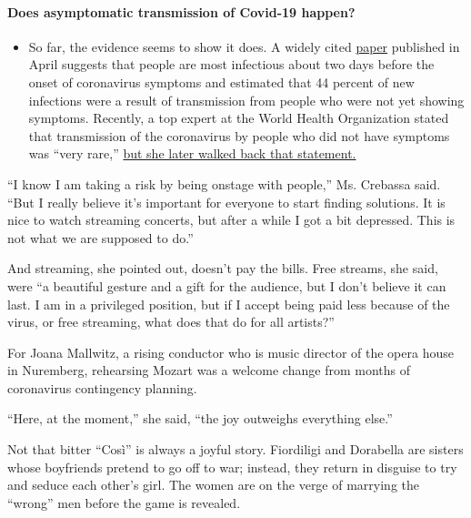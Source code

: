 \begin{itemize}
{  \paragraph{Does asymptomatic transmission of Covid-19
  happen?}\label{does-asymptomatic-transmission-of-covid-19-happen}}

  \begin{itemize}
  \tightlist
  \item
    So far, the evidence seems to show it does. A widely cited
    \href{https://www.nature.com/articles/s41591-020-0869-5}{paper}
    published in April suggests that people are most infectious about
    two days before the onset of coronavirus symptoms and estimated that
    44 percent of new infections were a result of transmission from
    people who were not yet showing symptoms. Recently, a top expert at
    the World Health Organization stated that transmission of the
    coronavirus by people who did not have symptoms was ``very rare,''
    \href{https://www.nytimes3xbfgragh.onion/2020/06/09/world/coronavirus-updates.html?action=click\&pgtype=Article\&state=default\&region=MAIN_CONTENT_3\&context=storylines_faq\#link-1f302e21}{but
    she later walked back that statement.}
  \end{itemize}
\end{itemize}

``I know I am taking a risk by being onstage with people,'' Ms. Crebassa
said. ``But I really believe it's important for everyone to start
finding solutions. It is nice to watch streaming concerts, but after a
while I got a bit depressed. This is not what we are supposed to do.''

And streaming, she pointed out, doesn't pay the bills. Free streams, she
said, were ``a beautiful gesture and a gift for the audience, but I
don't believe it can last. I am in a privileged position, but if I
accept being paid less because of the virus, or free streaming, what
does that do for all artists?''

For Joana Mallwitz, a rising conductor who is music director of the
opera house in Nuremberg, rehearsing Mozart was a welcome change from
months of coronavirus contingency planning.

``Here, at the moment,'' she said, ``the joy outweighs everything
else.''

Not that bitter ``Così'' is always a joyful story. Fiordiligi and
Dorabella are sisters whose boyfriends pretend to go off to war;
instead, they return in disguise to try and seduce each other's girl.
The women are on the verge of marrying the ``wrong'' men before the game
is revealed.


